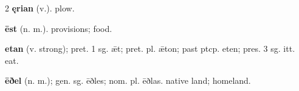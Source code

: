 \begin{multicols*}{2}
\textbf{ęrian} (v.). plow.\par
\textbf{ēst} (n. m.). provisions; food.\par
\textbf{etan} (v. strong); pret. 1 sg. ǣt; pret. pl. ǣton; past ptcp. eten; pres. 3 sg. itt. eat.\par
\textbf{ēðel} (n. m.); gen. sg. ēðles; nom. pl. ēðlas. native land; homeland.\par

\end{multicols*}
